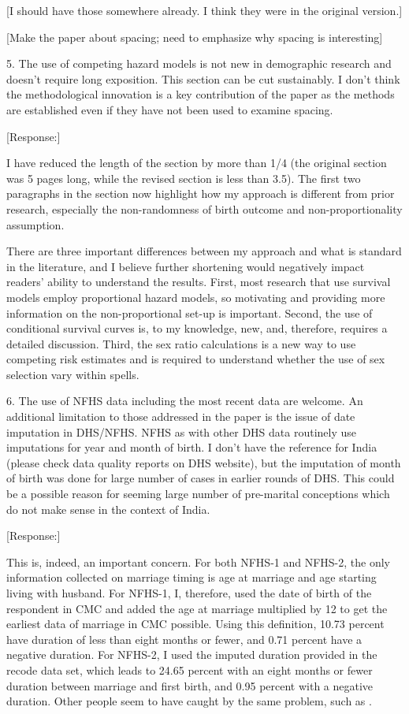 \documentclass[letterpaper,12pt]{article}
\begin{document}
[I should have those somewhere already. I think they were in the original version.]

[Make the paper about spacing; need to emphasize why spacing is interesting]

5. The use of competing hazard models is not new in demographic research
and doesn’t require long exposition. This section can be cut
sustainably. I don’t think the methodological innovation is a key
contribution of the paper as the methods are established even if they
have not been used to examine spacing.

[Response:]

I have reduced the length of the section by more than 1/4 (the original section was 5
pages long, while the revised section is less than 3.5).
The first two paragraphs in the section now highlight how my approach is different from
prior research, especially the non-randomness of birth outcome and non-proportionality
assumption.

There are three important differences between my approach and what is standard
in the literature, and I believe further shortening would negatively impact readers'
ability to understand the results.
First, most research that use survival models employ proportional hazard models, so 
motivating and providing more information on the non-proportional set-up is important.
Second, the use of conditional survival curves is, to my knowledge, new, and, therefore,
requires a detailed discussion.
Third, the sex ratio calculations is a new way to use competing risk estimates and is 
required to understand whether the use of sex selection vary within spells.


6. The use of NFHS data including the most recent data are welcome. An
additional limitation to those addressed in the paper is the issue of
date imputation in DHS/NFHS. NFHS as with other DHS data routinely use
imputations for year and month of birth. I don’t have the reference for
India (please check data quality reports on DHS website), but the
imputation of month of birth was done for large number of cases in
earlier rounds of DHS. This could be a possible reason for seeming large
number of pre-marital conceptions which do not make sense in the context
of India.

[Response:]

This is, indeed, an important concern.
For both NFHS-1 and NFHS-2, the only information collected on marriage timing is age at 
marriage and age starting living with husband.
For NFHS-1, I, therefore, used the date of birth of the respondent in CMC and added the 
age at marriage multiplied by 12 to get the earliest data of marriage in CMC possible.
Using this definition, 10.73 percent have duration of less than eight months or fewer, and
0.71 percent have a negative duration.
For NFHS-2, I used the imputed duration provided in the recode data set, which leads to 
24.65 percent with an eight months or fewer duration between marriage and first birth, 
and 0.95 percent with a negative duration.
Other people seem to have caught by the same problem, such as \citet{Padmadas2004}.
\end{document}
